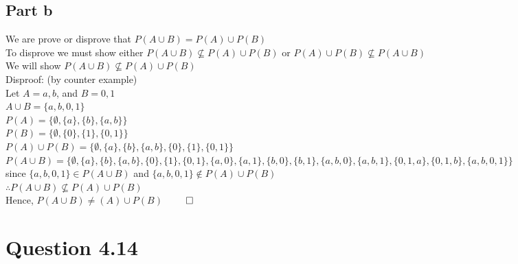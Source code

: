 \documentclass{article}
\begin{document}
		\subsection{Part b}
			We are prove or disprove that $P(A \cup B) = P(A) \cup P(B)$ \\
			To disprove we must show either $P(A \cup B) \not\subseteq P(A) \cup P(B)$ or $P(A) \cup P(B) \not\subseteq P(A \cup B)$ \\
			We will show $P(A \cup B) \not\subseteq P(A) \cup P(B)$ \\
			Disproof: (by counter example) \\
			Let $A = {a, b}$, and $B = {0, 1}$ \\
			$A \cup B = \{a, b, 0, 1\}$ \\
			$P(A) = \{\emptyset, \{a\}, \{b\}, \{a,b\}\}$ \\
			$P(B) = \{\emptyset, \{0\}, \{1\}, \{0, 1\}\}$ \\
			$P(A) \cup P(B) = \{\emptyset, \{a\}, \{b\}, \{a,b\}, \{0\}, \{1\}, \{0, 1\}\}$ \\
			$P(A \cup B) = \{\emptyset, \{a\}, \{b\}, \{a,b\}, \{0\}, \{1\}, \{0, 1\}, \{a, 0\}, \{a, 1\}, \{b, 0\}, \{b, 1\}, \{a, b, 0\}, \{a, b, 1\}, \{0, 1, a\}, \{0, 1, b\}, \{a, b, 0, 1\}\}$ \\
			since $\{a, b, 0, 1\} \in P(A \cup B)$ and $\{a, b, 0, 1\} \notin P(A) \cup P(B)$ \\
			$\therefore P(A \cup B) \not\subseteq P(A) \cup P(B)$ \\
			Hence, $P(A \cup B) \neq (A) \cup P(B)$ \hfill $\qed$
	\section{Question 4.14}
\end{document}
